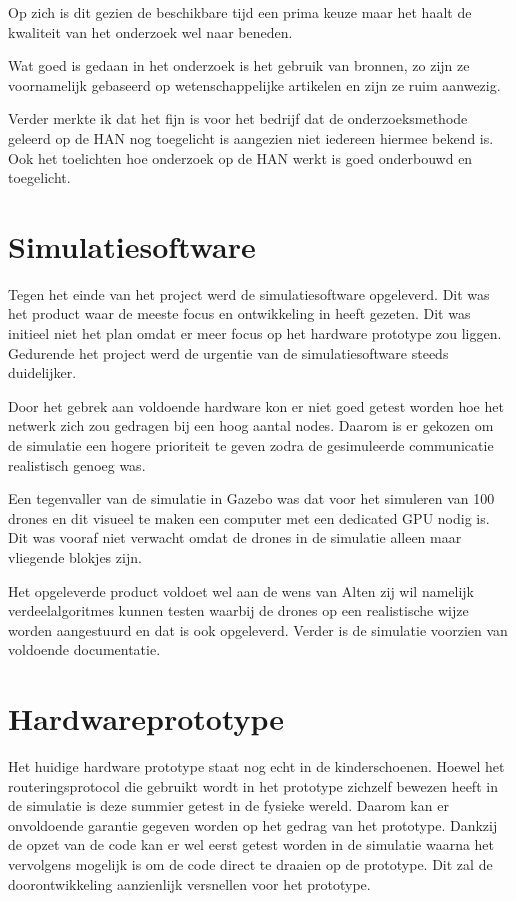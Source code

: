 \documentclass[a4paper, 11pt, oneside]{report}
\begin{document}
Op zich is dit gezien de beschikbare tijd een prima keuze maar het haalt de kwaliteit van het onderzoek wel naar beneden.

Wat goed is gedaan in het onderzoek is het gebruik van bronnen, zo zijn ze voornamelijk gebaseerd op wetenschappelijke artikelen en zijn ze ruim aanwezig.

Verder merkte ik dat het fijn is voor het bedrijf dat de onderzoeksmethode geleerd op de HAN nog toegelicht is aangezien niet iedereen hiermee bekend is. Ook het toelichten hoe onderzoek op de HAN werkt is goed onderbouwd en toegelicht.
  


\section{Simulatiesoftware}\label{sec:simulatiesoftware}
Tegen het einde van het project werd de simulatiesoftware opgeleverd. 
Dit was het product waar de meeste focus en ontwikkeling in heeft gezeten.
Dit was initieel niet het plan omdat er meer focus op het hardware prototype zou liggen.
Gedurende het project werd de urgentie van de simulatiesoftware steeds duidelijker.

Door het gebrek aan voldoende hardware kon er niet goed getest worden hoe het netwerk zich zou gedragen bij een hoog aantal nodes.
Daarom is er gekozen om de simulatie een hogere prioriteit te geven zodra de gesimuleerde communicatie realistisch genoeg was.

Een tegenvaller van de simulatie in Gazebo was dat voor het simuleren van 100 drones en dit visueel te maken een computer met een dedicated GPU nodig is. Dit was vooraf niet verwacht omdat de drones in de simulatie alleen maar vliegende blokjes zijn. 

Het opgeleverde product voldoet wel aan de wens van Alten zij wil namelijk verdeelalgoritmes kunnen testen waarbij de drones op een realistische wijze worden aangestuurd en dat is ook opgeleverd.  Verder is de simulatie voorzien van voldoende documentatie.  

\section{Hardwareprototype}\label{sec:hardwareprototype}
Het huidige hardware prototype staat nog echt in de kinderschoenen.
Hoewel het routeringsprotocol die gebruikt wordt in het prototype zichzelf bewezen heeft in de simulatie is deze summier getest in de fysieke wereld.
Daarom kan er onvoldoende garantie gegeven worden op het gedrag van het prototype.
Dankzij de opzet van de code kan er wel eerst getest worden in de simulatie waarna het vervolgens mogelijk is om de code direct te draaien op de prototype.
Dit zal de doorontwikkeling aanzienlijk versnellen voor het prototype.
\end{document}

